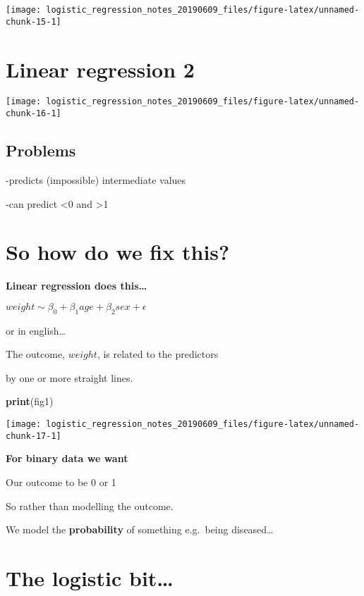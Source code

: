 \documentclass[]{tufte-handout}
\newenvironment{Shaded}{}{}
\newcommand{\KeywordTok}[1]{\textcolor[rgb]{0.00,0.44,0.13}{\textbf{#1}}}
\newcommand{\NormalTok}[1]{#1}
\begin{document}
\texttt{[image: logistic\_regression\_notes\_20190609\_files/figure-latex/unnamed-chunk-15-1]}

\hypertarget{linear-regression-2}{%
\section{Linear regression 2}\label{linear-regression-2}}

\texttt{[image: logistic\_regression\_notes\_20190609\_files/figure-latex/unnamed-chunk-16-1]}

\hypertarget{problems}{%
\subsection{Problems}\label{problems}}

-predicts (impossible) intermediate values

-can predict \textless{}0 and \textgreater{}1

\hypertarget{so-how-do-we-fix-this}{%
\section{So how do we fix this?}\label{so-how-do-we-fix-this}}

\textbf{Linear regression does this\ldots{}}

\(weight \sim \beta_0 + \beta_1 age + \beta_2 sex + \epsilon\)

or in english\ldots{}

The outcome, \(weight\), is related to the predictors

by one or more straight lines.

\begin{Shaded}
\begin{Highlighting}[]
\KeywordTok{print}\NormalTok{(fig1)}
\end{Highlighting}
\end{Shaded}

\texttt{[image: logistic\_regression\_notes\_20190609\_files/figure-latex/unnamed-chunk-17-1]}

\textbf{For binary data we want}

Our outcome to be 0 or 1

So rather than modelling the outcome.

We model the \textbf{probability} of something e.g.~being
diseased\ldots{}

\hypertarget{the-logistic-bit}{%
\section{The logistic bit\ldots{}}\label{the-logistic-bit}}
\end{document}
